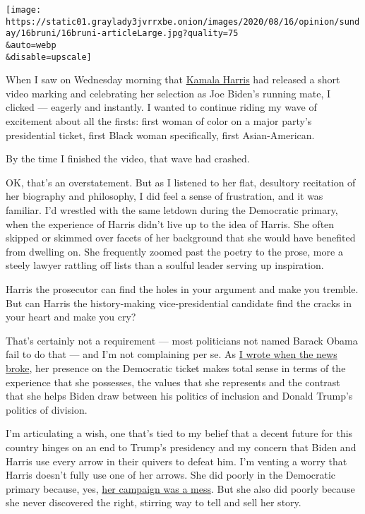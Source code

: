 \texttt{[image: https://static01.graylady3jvrrxbe.onion/images/2020/08/16/opinion/sunday/16bruni/16bruni-articleLarge.jpg?quality=75\\\&auto=webp\\\&disable=upscale]}

When I saw on Wednesday morning that
\href{https://www.nytimes3xbfgragh.onion/2020/08/14/technology/kamala-harris-disinformation.html}{Kamala
Harris} had released a short video marking and celebrating her selection
as Joe Biden's running mate, I clicked --- eagerly and instantly. I
wanted to continue riding my wave of excitement about all the firsts:
first woman of color on a major party's presidential ticket, first Black
woman specifically, first Asian-American.

By the time I finished the video, that wave had crashed.

OK, that's an overstatement. But as I listened to her flat, desultory
recitation of her biography and philosophy, I did feel a sense of
frustration, and it was familiar. I'd wrestled with the same letdown
during the Democratic primary, when the experience of Harris didn't live
up to the idea of Harris. She often skipped or skimmed over facets of
her background that she would have benefited from dwelling on. She
frequently zoomed past the poetry to the prose, more a steely lawyer
rattling off lists than a soulful leader serving up inspiration.

Harris the prosecutor can find the holes in your argument and make you
tremble. But can Harris the history-making vice-presidential candidate
find the cracks in your heart and make you cry?

That's certainly not a requirement --- most politicians not named Barack
Obama fail to do that --- and I'm not complaining per se. As
\href{https://www.nytimes3xbfgragh.onion/2020/08/11/opinion/kamala-harris-biden-running-mate.html}{I
wrote when the news broke}, her presence on the Democratic ticket makes
total sense in terms of the experience that she possesses, the values
that she represents and the contrast that she helps Biden draw between
his politics of inclusion and Donald Trump's politics of division.

I'm articulating a wish, one that's tied to my belief that a decent
future for this country hinges on an end to Trump's presidency and my
concern that Biden and Harris use every arrow in their quivers to defeat
him. I'm venting a worry that Harris doesn't fully use one of her
arrows. She did poorly in the Democratic primary because, yes,
\href{https://www.nytimes3xbfgragh.onion/2019/11/29/us/politics/kamala-harris-2020.html}{her
campaign was a mess}. But she also did poorly because she never
discovered the right, stirring way to tell and sell her story.

